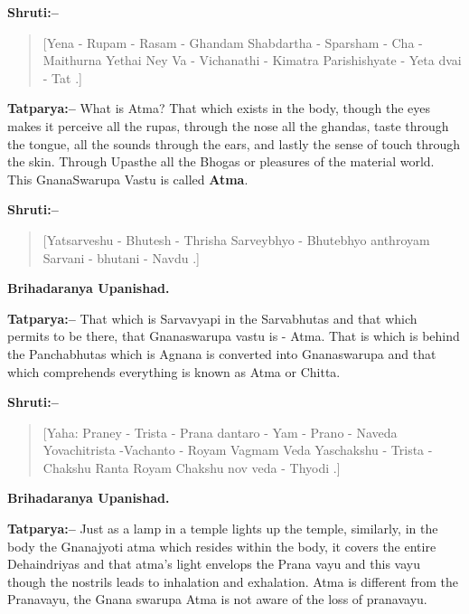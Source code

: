 \textbf{Shruti:–}

\begin{verse}
[Yena - Rupam - Rasam - Ghandam Shabdartha - Sparsham - Cha - Maithurna  Yethai Ney Va - Vichanathi - Kimatra Parishishyate - Yeta dvai - Tat .]
\end{verse}

\textbf{Tatparya:–} What is Atma? That which exists in the body, though the eyes makes it perceive all the rupas, through the nose all the ghandas, taste through the tongue, all the sounds through the ears, and lastly the sense of touch through the skin. Through Upasthe all the Bhogas or pleasures of the material world. This GnanaSwarupa Vastu is called \textbf{Atma}.

\newpage

\textbf{Shruti:–}

\begin{verse}
[Yatsarveshu - Bhutesh - Thrisha Sarveybhyo - Bhutebhyo anthroyam  Sarvani - bhutani - Navdu .]
\end{verse}

\begin{flushright}
\textbf{Brihadaranya Upanishad.}
\end{flushright}

\textbf{Tatparya:–} That which is Sarvavyapi in the Sarvabhutas and that which permits to be there, that Gnanaswarupa vastu is - Atma. That is which is behind the Panchabhutas which is Agnana is converted into Gnanaswarupa and that which comprehends everything is known as Atma or Chitta.

\textbf{Shruti:–}

\begin{verse}
[Yaha: Praney - Trista - Prana dantaro - Yam - Prano - Naveda  Yovachitrista -Vachanto - Royam Vagmam Veda  Yaschakshu - Trista - Chakshu Ranta Royam Chakshu nov veda - Thyodi .]
\end{verse}

\begin{flushright}
\textbf{Brihadaranya Upanishad.}
\end{flushright}

\textbf{Tatparya:–} Just as a lamp in a temple lights up the temple, similarly, in the body the Gnanajyoti atma which resides within the body, it covers the entire Dehaindriyas and that atma's light envelops the Prana vayu and this vayu though the nostrils leads to inhalation and exhalation. Atma is different from the Pranavayu, the Gnana swarupa Atma is not aware of the loss of pranavayu.

